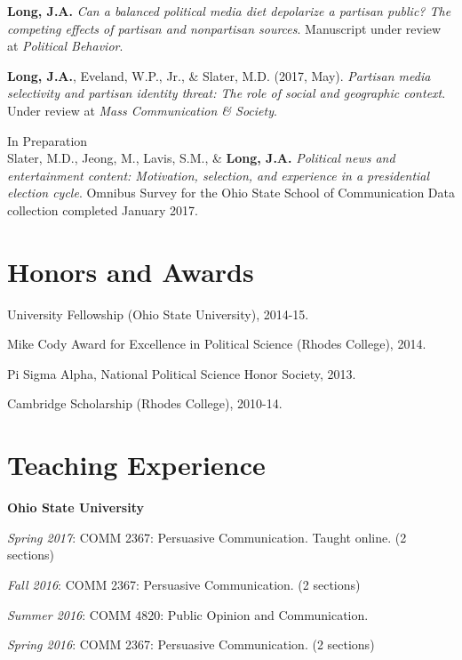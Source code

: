 \documentclass[margin,line]{res}
\begin{document}
\begin{resume}
\textbf{Long, J.A.} \emph{Can a balanced political media diet depolarize a partisan public? The competing effects of partisan and nonpartisan sources}. Manuscript under review at \emph{Political Behavior}.

{\bf Long, J.A.}, Eveland, W.P., Jr., \& Slater, M.D. (2017, May). \emph{Partisan media selectivity and partisan identity threat: The role of social and geographic context}. Under review at \emph{Mass Communication \& Society}.

{\sc In Preparation}\\
Slater, M.D., Jeong, M., Lavis, S.M., \& {\bf Long, J.A.} \emph{Political news and entertainment content: Motivation, selection, and experience in a presidential election cycle}. Omnibus Survey for the Ohio State School of Communication Data collection completed January 2017. 

\section{\sc Honors and Awards} 
University Fellowship (Ohio State University), 2014-15.

\vspace*{-2.5mm}
Mike Cody Award for Excellence in Political Science (Rhodes College), 2014.

\vspace*{-2.5mm}
Pi Sigma Alpha, National Political Science Honor Society, 2013.

\vspace*{-2.5mm}
Cambridge Scholarship (Rhodes College), 2010-14.

\section{\sc Teaching Experience}
{\bf Ohio State University}

\vspace*{-2.5mm}
\emph{Spring 2017}: COMM 2367: Persuasive Communication. Taught online. (2 sections)

\vspace*{-2.5mm}
\emph{Fall 2016}: COMM 2367: Persuasive Communication. (2 sections)

\vspace*{-2.5mm}
\emph{Summer 2016}: COMM 4820: Public Opinion and Communication.

\vspace*{-2.5mm}
\emph{Spring 2016}: COMM 2367: Persuasive Communication. (2 sections)


\end{resume}
\end{document}
